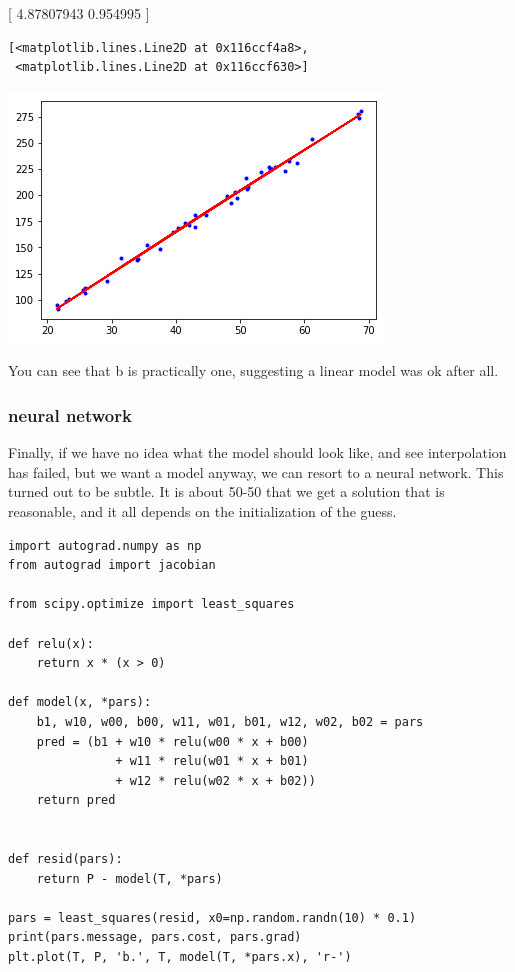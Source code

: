 \documentclass[11pt]{article}
\begin{document}
[ 4.87807943  0.954995  ]

\begin{verbatim}
[<matplotlib.lines.Line2D at 0x116ccf4a8>,
 <matplotlib.lines.Line2D at 0x116ccf630>]
\end{verbatim}



\begin{center}
\includegraphics[width=.9\linewidth]{obipy-resources/a10feaf5270288b4c795ebce6b64fde6-70304HKi.png}
\end{center}

You can see that b is practically one, suggesting a linear model was ok after all.

\subsubsection{neural network}
\label{sec:org5272205}

Finally, if we have no idea what the model should look like, and see interpolation has failed, but we want a model anyway, we can resort to a neural network. This turned out to be subtle. It is about 50-50 that we get a solution that is reasonable, and it all depends on the initialization of the guess.

\begin{verbatim}
import autograd.numpy as np
from autograd import jacobian

from scipy.optimize import least_squares

def relu(x):
    return x * (x > 0)

def model(x, *pars):
    b1, w10, w00, b00, w11, w01, b01, w12, w02, b02 = pars
    pred = (b1 + w10 * relu(w00 * x + b00)
               + w11 * relu(w01 * x + b01)
               + w12 * relu(w02 * x + b02))
    return pred


def resid(pars):
    return P - model(T, *pars)

pars = least_squares(resid, x0=np.random.randn(10) * 0.1)
print(pars.message, pars.cost, pars.grad)
plt.plot(T, P, 'b.', T, model(T, *pars.x), 'r-')
\end{verbatim}
\end{document}
